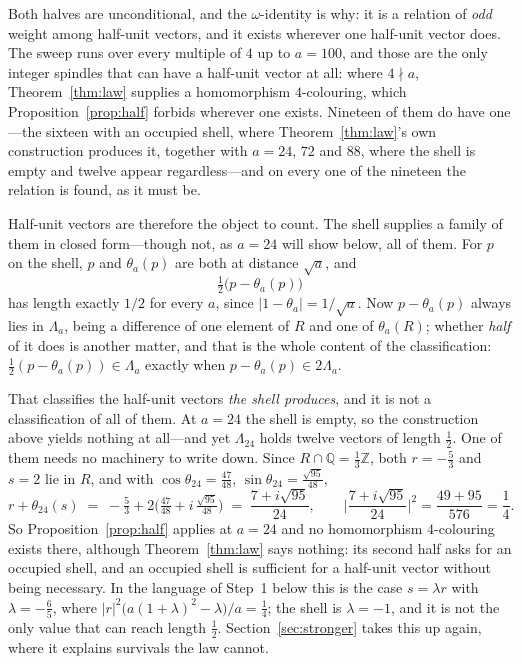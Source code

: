 \documentclass[11pt,reqno]{amsart}
\theoremstyle{plain}
\theoremstyle{definition}
\newcommand{\Z}{\mathbb{Z}}
\newcommand{\Q}{\mathbb{Q}}
\newcommand{\Lat}{R}
\newcommand{\Lam}{\Lambda}
\begin{document}
Both halves are unconditional, and the $\omega$-identity is why: it is a relation
of \emph{odd} weight among half-unit vectors, and it exists wherever one
half-unit vector does. The sweep runs over every multiple of $4$ up to
$a = 100$, and those are the only integer spindles that can have a half-unit
vector at all: where $4 \nmid a$, Theorem~\ref{thm:law} supplies a homomorphism
$4$-colouring, which Proposition~\ref{prop:half} forbids wherever one exists.
Nineteen of them do have one---the sixteen with an occupied shell, where
Theorem~\ref{thm:law}'s own construction produces it, together with $a = 24$,
$72$ and $88$, where the shell is empty and twelve appear regardless---and on
every one of the nineteen the relation is found, as it must be.


Half-unit vectors are therefore the object to count. The shell supplies a family
of them in closed form---though not, as $a = 24$ will show below, all of them.
For $p$ on the shell, $p$ and $\theta_a(p)$ are both at distance
$\sqrt a$, and
\[
  \tfrac12\big(p - \theta_a(p)\big)
\]
has length exactly $1/2$ for every $a$, since $\lvert 1 - \theta_a \rvert =
1/\sqrt a$. Now $p - \theta_a(p)$ always lies in $\Lam_a$, being a difference of
one element of $\Lat$ and one of $\theta_a(\Lat)$; whether \emph{half} of it does
is another matter, and that is the whole content of the classification:
$\tfrac12(p-\theta_a(p)) \in \Lam_a$ exactly when $p - \theta_a(p) \in 2\Lam_a$.

That classifies the half-unit vectors \emph{the shell produces}, and it is not a
classification of all of them. At $a = 24$ the shell is empty, so the
construction above yields nothing at all---and yet $\Lam_{24}$ holds twelve
vectors of length $\tfrac12$. One of them needs no machinery to write down. Since
$\Lat \cap \Q = \tfrac13\Z$, both $r = -\tfrac53$ and $s = 2$ lie in $\Lat$, and
with $\cos\theta_{24} = \tfrac{47}{48}$, $\sin\theta_{24} = \tfrac{\sqrt{95}}{48}$,
\[
  r + \theta_{24}(s)
  \;=\; -\tfrac53 + 2\Big(\tfrac{47}{48} + i\,\tfrac{\sqrt{95}}{48}\Big)
  \;=\; \frac{7 + i\sqrt{95}}{24},
  \qquad
  \Big\lvert \frac{7+i\sqrt{95}}{24} \Big\rvert^2 = \frac{49+95}{576} = \frac14 .
\]
So Proposition~\ref{prop:half} applies at $a = 24$ and no homomorphism
$4$-colouring exists there, although Theorem~\ref{thm:law} says nothing: its
second half asks for an occupied shell, and an occupied shell is sufficient for a
half-unit vector without being necessary. In the language of Step~1 below this
is the case $s = \lambda r$ with $\lambda = -\tfrac65$, where
$\lvert r \rvert^2\big(a(1+\lambda)^2 - \lambda\big)/a = \tfrac14$; the shell is
$\lambda = -1$, and it is not the only value that can reach length $\tfrac12$.
Section~\ref{sec:stronger} takes this up again, where it explains survivals the
law cannot.
\end{document}
